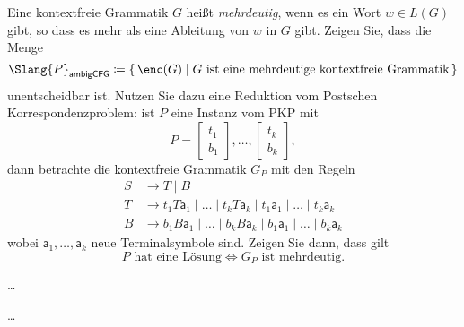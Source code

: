 \documentclass[german]{latteachCD}[2017/03/28]
\begin{document}
\begin{exercise}
  Eine kontextfreie Grammatik $G$ heißt \emph{mehrdeutig}, wenn es ein Wort $w
  \in L(G)$ gibt, so dass es mehr als eine Ableitung von $w$ in $G$ gibt.
  Zeigen Sie, dass die Menge
  \begin{equation*}
    \Slang{P}_{\mathsf{ambigCFG}} \coloneqq \{\, \enc(G) \mid G \text{ ist eine
      mehrdeutige kontextfreie Grammatik}\,\}
  \end{equation*}
  unentscheidbar ist.  Nutzen Sie dazu eine Reduktion vom Postschen
  Korrespondenzproblem: ist $P$ eine Instanz vom PKP mit
  \def\BB#1{\begin{bmatrix}#1\end{bmatrix}}
  \begin{equation*}
    P = \BB{t_{1}\\b_{1}}, \dots, \BB{t_{k}\\b_{k}},
  \end{equation*}
  dann betrachte die kontextfreie Grammatik $G_{P}$ mit den Regeln
  \begin{align*}
    S &\to T \mid B\\
    T &\to t_{1}T\mathsf{a}_{1} \mid \dots \mid t_{k}T\mathsf{a}_{k} \mid
        t_{1}\mathsf{a}_{1} \mid \dots \mid t_{k}\mathsf{a}_{k}\\
    B &\to b_{1}B\mathsf{a}_{1} \mid \dots \mid b_{k}B\mathsf{a}_{k} \mid
        b_{1}\mathsf{a}_{1} \mid \dots \mid b_{k}\mathsf{a}_{k}
  \end{align*}
  wobei $\mathsf{a}_{1}, \dots, \mathsf{a}_{k}$ neue Terminalsymbole sind.
  Zeigen Sie dann, dass gilt
  \begin{equation*}
    P \text{ hat eine Lösung} \iff G_{P} \text{ ist mehrdeutig}.
  \end{equation*}
\end{exercise}

\begin{exercise}
  \dots
\end{exercise}

\begin{exercise}
  \dots
\end{exercise}
\end{document}
